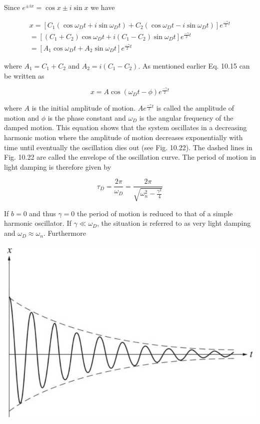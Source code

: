 \documentclass[10pt]{article}
\begin{document}
Since $e^{ \pm i x}=\cos x \pm i \sin x$ we have


\begin{gather*}
x=\left[C_{1}\left(\cos \omega_{D} t+i \sin \omega_{D} t\right)+C_{2}\left(\cos \omega_{D} t-i \sin \omega_{D} t\right)\right] e^{\frac{-\gamma}{2} t} \\
=\left[\left(C_{1}+C_{2}\right) \cos \omega_{D} t+i\left(C_{1}-C_{2}\right) \sin \omega_{D} t\right] e^{\frac{-\gamma}{2} t} \\
=\left[A_{1} \cos \omega_{D} t+A_{2} \sin \omega_{D} t\right] e^{\frac{-\gamma}{2} t} \tag{10.15}
\end{gather*}


where $A_{1}=C_{1}+C_{2}$ and $A_{2}=i\left(C_{1}-C_{2}\right)$. As mentioned earlier Eq. 10.15 can be written as


\begin{equation*}
x=A \cos \left(\omega_{D} t-\phi\right) e^{\frac{-\gamma}{2} t} \tag{10.16}
\end{equation*}


where $A$ is the initial amplitude of motion. $A e^{\frac{-\gamma}{2} t}$ is called the amplitude of motion and $\phi$ is the phase constant and $\omega_{D}$ is the angular frequency of the damped motion. This equation shows that the system oscillates in a decreasing harmonic motion where the amplitude of motion decreases exponentially with time until eventually the oscillation dies out (see Fig. 10.22). The dashed lines in Fig. 10.22 are called the envelope of the oscillation curve. The period of motion in light damping is therefore given by

$$
\tau_{D}=\frac{2 \pi}{\omega_{D}}=\frac{2 \pi}{\sqrt{\omega_{n}^{2}-\frac{\gamma^{2}}{4}}}
$$

If $b=0$ and thus $\gamma=0$ the period of motion is reduced to that of a simple harmonic oscillator. If $\gamma \ll \omega_{D}$, the situation is referred to as very light damping and $\omega_{D} \approx \omega_{n}$. Furthermore

\begin{center}
\includegraphics[max width=\textwidth]{2024_09_13_db1f357d2aad0a03eb2eg-174}
\end{center}
\end{document}
